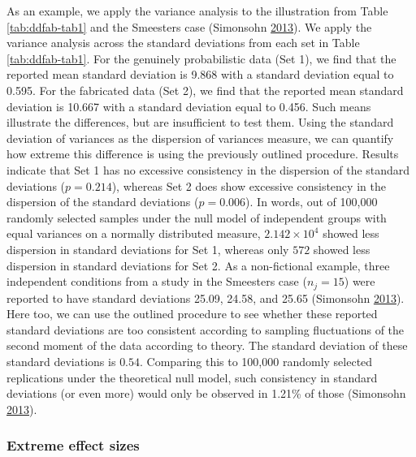 \documentclass[a5paper]{book}
\begin{document}
As an example, we apply the variance analysis to the illustration from
Table \ref{tab:ddfab-tab1} and the Smeesters case (Simonsohn
\protect\hyperlink{ref-doi:10.1177ux2f0956797613480366}{2013}). We apply
the variance analysis across the standard deviations from each set in
Table \ref{tab:ddfab-tab1}. For the genuinely probabilistic data (Set
1), we find that the reported mean standard deviation is 9.868 with a
standard deviation equal to 0.595. For the fabricated data (Set 2), we
find that the reported mean standard deviation is 10.667 with a standard
deviation equal to 0.456. Such means illustrate the differences, but are
insufficient to test them. Using the standard deviation of variances as
the dispersion of variances measure, we can quantify how extreme this
difference is using the previously outlined procedure. Results indicate
that Set 1 has no excessive consistency in the dispersion of the
standard deviations (\(p=0.214\)), whereas Set 2 does show excessive
consistency in the dispersion of the standard deviations (\(p=0.006\)).
In words, out of 100,000 randomly selected samples under the null model
of independent groups with equal variances on a normally distributed
measure, \(\ensuremath{2.142\times 10^{4}}\) showed less dispersion in
standard deviations for Set 1, whereas only \(572\) showed less
dispersion in standard deviations for Set 2. As a non-fictional example,
three independent conditions from a study in the Smeesters case
(\(n_j=15\)) were reported to have standard deviations 25.09, 24.58, and
25.65 (Simonsohn
\protect\hyperlink{ref-doi:10.1177ux2f0956797613480366}{2013}). Here
too, we can use the outlined procedure to see whether these reported
standard deviations are too consistent according to sampling
fluctuations of the second moment of the data according to theory. The
standard deviation of these standard deviations is \(0.54\). Comparing
this to 100,000 randomly selected replications under the theoretical
null model, such consistency in standard deviations (or even more) would
only be observed in 1.21\% of those (Simonsohn
\protect\hyperlink{ref-doi:10.1177ux2f0956797613480366}{2013}).

\subsubsection{Extreme effect sizes}\label{extreme-effect-sizes}
\end{document}
